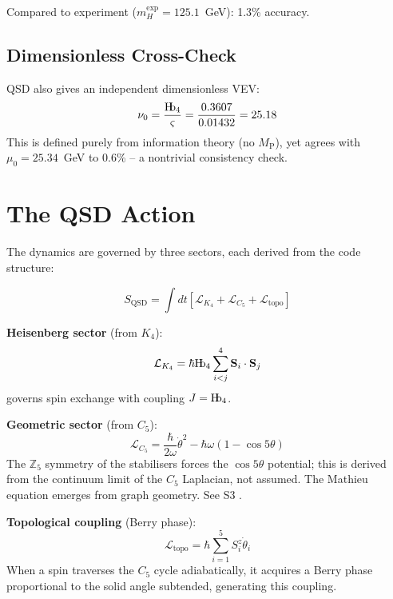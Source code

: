 \documentclass[11pt,a4paper]{article}
\theoremstyle{definition}
\newcommand{\Hb}{\textnormal{H\kern-0.3em b}}
\newcommand{\Hbfour}{\Hb_4}
\newcommand{\strain}{\varsigma}
\newcommand{\Mpl}{M_{\mathrm{P}}}
\newcommand{\mH}{m_H}
\newcommand{\murad}{\mu_0}
\newcommand{\nurad}{\nu_0}
\newcommand{\LL}{\mathcal{L}}
\begin{document}
Compared to experiment ($\mH^{\text{exp}} = 125.1$~GeV): 1.3\% accuracy.

\subsection{Dimensionless Cross-Check}

QSD also gives an independent dimensionless VEV:
\begin{equation}
\nurad = \frac{\Hbfour}{\strain} = \frac{0.3607}{0.01432} = 25.18
\end{equation}
This is defined purely from information theory (no $\Mpl$), yet agrees with $\murad = 25.34$~GeV to 0.6\% -- a nontrivial consistency check.

\section{The QSD Action}
\label{sec:action}

The dynamics are governed by three sectors, each derived from the code structure:

\begin{equation}
S_{\text{QSD}} = \int dt \left[ \LL_{K_4} + \LL_{C_5} + \LL_{\text{topo}} \right]
\label{eq:action}
\end{equation}

\textbf{Heisenberg sector} (from $K_4$):
\begin{equation}
\LL_{K_4} = \hbar\Hbfour \sum_{i<j}^{4} \mathbf{S}_i \cdot \mathbf{S}_j
\end{equation}
governs spin exchange with coupling $J = \Hbfour$.

\textbf{Geometric sector} (from $C_5$):
\begin{equation}
\LL_{C_5} = \frac{\hbar}{2\omega}\dot{\theta}^2 - \hbar\omega(1 - \cos 5\theta)
\end{equation}
The $\mathbb{Z}_5$ symmetry of the stabilisers forces the $\cos 5\theta$ potential; this is derived from the continuum limit of the $C_5$ Laplacian, not assumed. The Mathieu equation emerges from graph geometry. See S3 \cite{Hubka2026QSDsupp}.

\textbf{Topological coupling} (Berry phase):
\begin{equation}
\LL_{\text{topo}} = \hbar \sum_{i=1}^{5} S_i^z \dot{\theta}_i
\end{equation}
When a spin traverses the $C_5$ cycle adiabatically, it acquires a Berry phase proportional to the solid angle subtended, generating this coupling.
\end{document}

